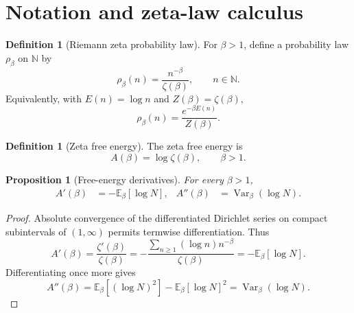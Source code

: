 \documentclass[11pt]{article}
\numberwithin{equation}{section}
\newtheorem{proposition}[theorem]{Proposition}
\theoremstyle{definition}
\newtheorem{definition}[theorem]{Definition}
\theoremstyle{remark}
\DeclareMathOperator{\Var}{Var}
\newcommand{\E}{\mathbb E}
\newcommand{\N}{\mathbb N}
\newcommand{\1}{\mathbf 1}
\begin{document}
\section{Notation and zeta-law calculus}

\begin{definition}[Riemann zeta probability law]
\label{def:zeta-law}
For \(\beta>1\), define a probability law \(\rho_\beta\) on \(\N\) by
\begin{equation}
\label{eq:zeta-law}
\rho_\beta(n)=\frac{n^{-\beta}}{\zeta(\beta)},\qquad n\in\N.
\end{equation}
Equivalently, with \(E(n)=\log n\) and \(Z(\beta)=\zeta(\beta)\),
\begin{equation}
\label{eq:gibbs-form}
\rho_\beta(n)=\frac{e^{-\beta E(n)}}{Z(\beta)}.
\end{equation}
\end{definition}

\begin{definition}[Zeta free energy]
\label{def:zeta-free-energy}
The zeta free energy is
\begin{equation}
\label{eq:zeta-free-energy}
A(\beta)=\log\zeta(\beta),\qquad \beta>1.
\end{equation}
\end{definition}

\begin{proposition}[Free-energy derivatives]
\label{prop:free-energy-derivatives}
For every \(\beta>1\),
\begin{align}
\label{eq:free-energy-derivatives}
A'(\beta)&=-\E_\beta[\log N],&
A''(\beta)&=\Var_\beta(\log N).
\end{align}
\end{proposition}

\begin{proof}
Absolute convergence of the differentiated Dirichlet series on compact subintervals of \((1,\infty)\) permits termwise differentiation.  Thus
\begin{equation}
\label{eq:first-free-derivative-proof}
A'(\beta)=\frac{\zeta'(\beta)}{\zeta(\beta)}
=-\frac{\sum_{n\ge1}(\log n)n^{-\beta}}{\zeta(\beta)}
=-\E_\beta[\log N].
\end{equation}
Differentiating once more gives
\begin{equation}
\label{eq:second-free-derivative-proof}
A''(\beta)=\E_\beta[(\log N)^2]-\E_\beta[\log N]^2
=\Var_\beta(\log N).
\end{equation}
\end{proof}
\end{document}
